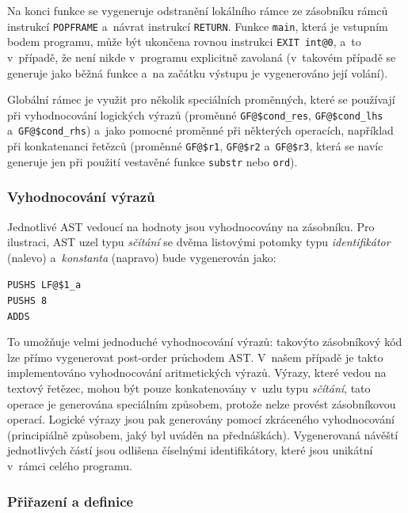 \documentclass[11pt]{article}
\begin{document}
Na konci funkce se vygeneruje odstranění lokálního rámce ze zásobníku rámců instrukcí \texttt{POPFRAME} a~návrat instrukcí \texttt{RETURN}. Funkce \texttt{main}, která je vstupním bodem programu, může být ukončena rovnou instrukci \texttt{EXIT int@0}, a~to v~případě, že není nikde v~programu explicitně zavolaná (v~takovém případě se generuje jako běžná funkce a~na začátku výstupu je vygenerováno její volání).

Globální rámec je využit pro několik speciálních proměnných, které se používají při vyhodnocování logických výrazů (proměnné \texttt{GF@\$cond\_res}, \texttt{GF@\$cond\_lhs} a~\texttt{GF@\$cond\_rhs}) a~jako pomocné proměnné při některých operacích, například při konkatenanci řetězců (proměnné \texttt{GF@\$r1}, \texttt{GF@\$r2} a~\texttt{GF@\$r3}, která se navíc generuje jen při použití vestavěné funkce \texttt{substr} nebo \texttt{ord}).

\subsubsection{Vyhodnocování výrazů}

Jednotlivé AST vedoucí na hodnoty jsou vyhodnocovány na zásobníku. Pro ilustraci, AST uzel typu \emph{sčítání} se dvěma listovými potomky typu \emph{identifikátor} (nalevo) a~\emph{konstanta} (napravo) bude vygenerován jako:

\begin{centerbox}[0.2\linewidth]
    \texttt{PUSHS LF@\$1\_a\\
            PUSHS 8\\
            ADDS}
\end{centerbox}

To umožňuje velmi jednoduché vyhodnocování výrazů: takovýto zásobníkový kód lze přímo vygenerovat post-order průchodem AST. V~našem případě je takto implementováno vyhodnocování aritmetických výrazů. Výrazy, které vedou na textový řetězec, mohou být pouze konkatenovány v~uzlu typu \emph{sčítání}, tato operace je generována speciálním způsobem, protože nelze provést zásobníkovou operací. Logické výrazy jsou pak generovány pomocí zkráceného vyhodnocování (principiálně způsobem, jaký byl uváděn na přednáškách). Vygenerovaná návěští jednotlivých částí jsou odlišena číselnými identifikátory, které jsou unikátní v~rámci celého programu.

\subsubsection{Přiřazení a definice}
\end{document}
